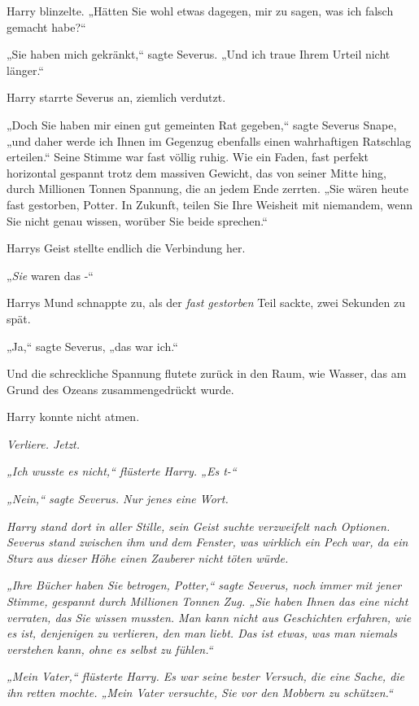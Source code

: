 {Harry blinzelte. „Hätten Sie wohl etwas dagegen, mir zu sagen, was ich falsch gemacht habe?“

„Sie haben mich gekränkt,“ sagte Severus. „Und ich traue Ihrem Urteil nicht länger.“

Harry starrte Severus an, ziemlich verdutzt.

„Doch Sie haben mir einen gut gemeinten Rat gegeben,“ sagte Severus Snape, „und daher werde ich Ihnen im Gegenzug ebenfalls einen wahrhaftigen Ratschlag erteilen.“ Seine Stimme war fast völlig ruhig. Wie ein Faden, fast perfekt horizontal gespannt trotz dem massiven Gewicht, das von seiner Mitte hing, durch Millionen Tonnen Spannung, die an jedem Ende zerrten. „Sie wären heute fast gestorben, Potter. In Zukunft, teilen Sie Ihre Weisheit mit niemandem, wenn Sie nicht genau wissen, worüber Sie beide sprechen.“

Harrys Geist stellte endlich die Verbindung her.

„\emph{Sie} waren das -“

Harrys Mund schnappte zu, als der \emph{fast gestorben} Teil sackte, zwei Sekunden zu spät.

„Ja,“ sagte Severus, „das war ich.“

Und die schreckliche Spannung flutete zurück in den Raum, wie Wasser, das am Grund des Ozeans zusammengedrückt wurde.

Harry konnte nicht atmen.

\emph{Verliere. Jetzt.}

\emph{„Ich wusste es nicht,“ flüsterte Harry. „Es t-“}

\emph{„Nein,“ sagte Severus. Nur jenes eine Wort.}

\emph{Harry stand dort in aller Stille, sein Geist suchte verzweifelt nach Optionen. Severus stand zwischen ihm und dem Fenster, was wirklich ein Pech war, da ein Sturz aus dieser Höhe einen Zauberer nicht töten würde.}

\emph{„Ihre Bücher haben Sie betrogen, Potter,“ sagte Severus, noch immer mit jener Stimme, gespannt durch Millionen Tonnen Zug. „Sie haben Ihnen das eine nicht verraten, das Sie wissen mussten. Man kann nicht aus Geschichten erfahren, wie es ist, denjenigen zu verlieren, den man liebt. Das ist etwas, was man niemals verstehen kann, ohne es selbst zu fühlen.“}

\emph{„Mein Vater,“ flüsterte Harry. Es war seine bester Versuch, die eine Sache, die ihn retten mochte. „Mein Vater versuchte, Sie vor den Mobbern zu schützen.“}

}
